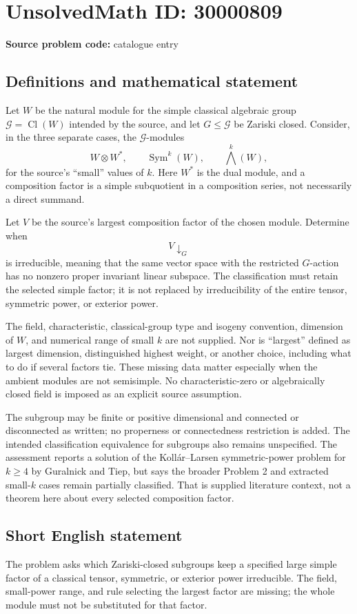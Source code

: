 \documentclass[11pt]{article}
\begin{document}
\section*{UnsolvedMath ID: 30000809}
\textbf{Source problem code:} catalogue entry
\subsection{Definitions and mathematical statement}
Let $W$ be the natural module for the simple classical algebraic group $\mathcal G=\operatorname{Cl}(W)$ intended by the source, and let $G\le\mathcal G$ be Zariski closed. Consider, in the three separate cases, the $\mathcal G$-modules
\[
 W\otimes W^*,\qquad\operatorname{Sym}^k(W),\qquad\bigwedge^k(W),
\]
for the source's ``small'' values of $k$. Here $W^*$ is the dual module, and a composition factor is a simple subquotient in a composition series, not necessarily a direct summand.

Let $V$ be the source's largest composition factor of the chosen module. Determine when
\[
 V\mathbin{\downarrow}_G
\]
is irreducible, meaning that the same vector space with the restricted $G$-action has no nonzero proper invariant linear subspace. The classification must retain the selected simple factor; it is not replaced by irreducibility of the entire tensor, symmetric power, or exterior power.

The field, characteristic, classical-group type and isogeny convention, dimension of $W$, and numerical range of small $k$ are not supplied. Nor is ``largest'' defined as largest dimension, distinguished highest weight, or another choice, including what to do if several factors tie. These missing data matter especially when the ambient modules are not semisimple. No characteristic-zero or algebraically closed field is imposed as an explicit source assumption.

The subgroup may be finite or positive dimensional and connected or disconnected as written; no properness or connectedness restriction is added. The intended classification equivalence for subgroups also remains unspecified. The assessment reports a solution of the Koll\'ar--Larsen symmetric-power problem for $k\ge4$ by Guralnick and Tiep, but says the broader Problem 2 and extracted small-$k$ cases remain partially classified. That is supplied literature context, not a theorem here about every selected composition factor.
\subsection{Short English statement}
The problem asks which Zariski-closed subgroups keep a specified large simple factor of a classical tensor, symmetric, or exterior power irreducible. The field, small-power range, and rule selecting the largest factor are missing; the whole module must not be substituted for that factor.
\end{document}

